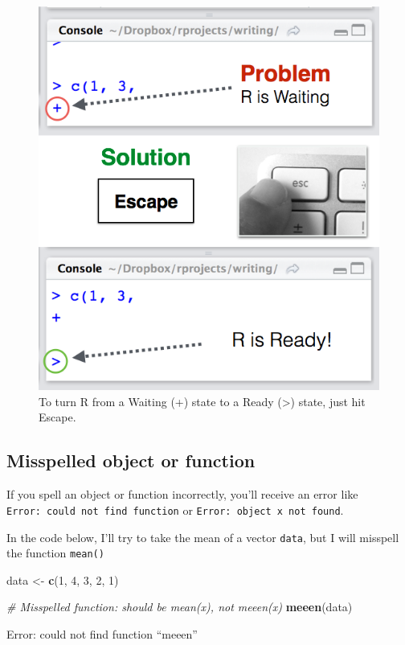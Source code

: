 \documentclass[
]{book}
\newenvironment{Shaded}{\begin{snugshade}}{\end{snugshade}}
\newcommand{\CommentTok}[1]{\textcolor[rgb]{0.56,0.35,0.01}{\textit{#1}}}
\newcommand{\DecValTok}[1]{\textcolor[rgb]{0.00,0.00,0.81}{#1}}
\newcommand{\KeywordTok}[1]{\textcolor[rgb]{0.13,0.29,0.53}{\textbf{#1}}}
\newcommand{\NormalTok}[1]{#1}
\newcommand{\StringTok}[1]{\textcolor[rgb]{0.31,0.60,0.02}{#1}}
\begin{document}
\begin{figure}

{\centering \includegraphics[width=0.5\linewidth]{images/escapesolution} 

}

\caption{To turn R from a Waiting (+) state to a Ready (>) state, just hit Escape.}\label{fig:rstate}
\end{figure}

\hypertarget{misspelled-object-or-function}{%
\subsection{Misspelled object or function}\label{misspelled-object-or-function}}

If you spell an object or function incorrectly, you'll receive an error like \texttt{Error:\ could\ not\ find\ function} or \texttt{Error:\ object\ \textquotesingle{}x\textquotesingle{}\ not\ found}.

In the code below, I'll try to take the mean of a vector \texttt{data}, but I will misspell the function \texttt{mean()}

\begin{Shaded}
\begin{Highlighting}[]
\NormalTok{data <-}\StringTok{ }\KeywordTok{c}\NormalTok{(}\DecValTok{1}\NormalTok{, }\DecValTok{4}\NormalTok{, }\DecValTok{3}\NormalTok{, }\DecValTok{2}\NormalTok{, }\DecValTok{1}\NormalTok{)}

\CommentTok{# Misspelled function: should be mean(x), not meeen(x)}
\KeywordTok{meeen}\NormalTok{(data)}
\end{Highlighting}
\end{Shaded}

\begin{error}

Error: could not find function ``meeen''

\end{error}
\end{document}
